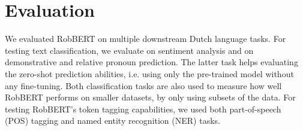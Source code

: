 \documentclass[11pt,a4paper]{article}
\begin{document}
\section{Evaluation}

We evaluated RobBERT on multiple downstream Dutch language tasks.
For testing text classification, we evaluate on sentiment analysis and on demonstrative and relative pronoun prediction.
The latter task helps evaluating the zero-shot prediction abilities, i.e. using only the pre-trained model without any fine-tuning.
Both classification tasks are also used to measure how well RobBERT performs on smaller datasets, by only using subsets of the data.
For testing RobBERT's token tagging capabilities, we used both part-of-speech (POS) tagging and named entity recognition (NER) tasks.
\end{document}

